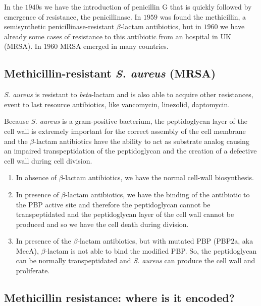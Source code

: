 In the $1940$s we have the introduction of penicillin G that is quickly followed by emergence of resistance, the penicillinase. 
In $1959$ was found the methicillin, a semisynthetic penicillinase-resistant $\beta$-lactam antibiotics, but in $1960$ we have already some cases of resistance to this antibiotic from an hospital in UK (MRSA). In $1960$ MRSA emerged in many countries. 

\subsection{Methicillin-resistant \emph{S. aureus} (MRSA)}

\emph{S. aureus} is resistant to \emph{beta}-lactam and is also able to acquire other resistances, event to last resource antibiotics, like vancomycin, linezolid, daptomycin.

Because \emph{S. aureus} is a gram-positive bacterium, the peptidoglycan layer of the cell wall is extremely important for the correct assembly of the cell membrane and the $\beta$-lactam antibiotics have the ability to act as substrate analog causing an impaired transpeptidation of the peptidoglycan and the creation of a defective cell wall during cell division.

\begin{enumerate}
    \item In absence of $\beta$-lactam antibiotics, we have the normal cell-wall biosynthesis.
    \item In presence of $\beta$-lactam antibiotics, we have the binding of the antibiotic to the PBP active site and therefore the peptidoglycan cannot be transpeptidated and the peptidoglycan layer of the cell wall cannot be produced and so we have the cell death during division. 
    \item In presence of the $\beta$-lactam antibiotics, but with mutated PBP (PBP$2$a, aka MecA), $\beta$-lactam is not able to bind the modified PBP. So, the peptidoglycan can be normally transpeptidated and \emph{S. aureus} can produce the cell wall and proliferate. 
\end{enumerate}

\subsection{Methicillin resistance: where is it encoded?}

